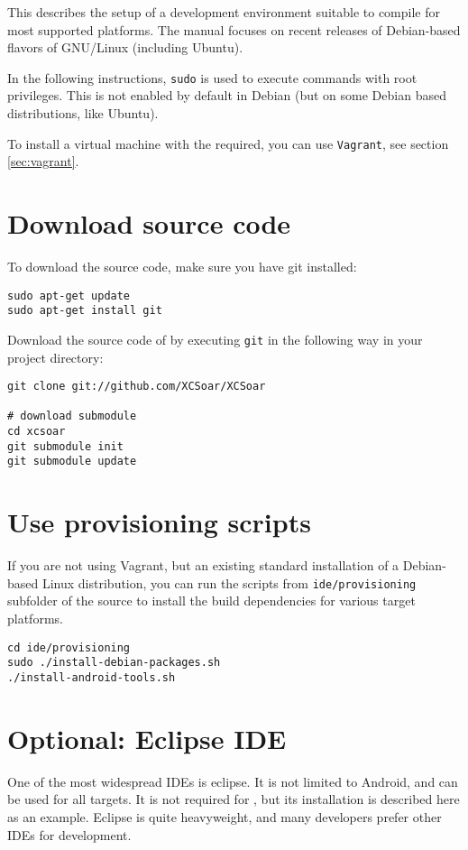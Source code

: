 This describes the setup of a development environment suitable to compile \xc
for most supported platforms. The manual focuses on recent releases of
Debian-based flavors of GNU/Linux (including Ubuntu).

In the following instructions, \texttt{sudo} is used to execute commands with
root privileges. This is not enabled by default in Debian (but on some Debian
based distributions, like Ubuntu).

To install a virtual machine with the required, you can use \texttt{Vagrant},
see section \ref{sec:vagrant}.

\section{Download source code}
To download the \xc source code, make sure you have git installed:
\begin{verbatim}
sudo apt-get update
sudo apt-get install git
\end{verbatim}

Download the source code of \xc by executing \texttt{git} in the following way in
your project directory:
\begin{verbatim}
git clone git://github.com/XCSoar/XCSoar

# download submodule
cd xcsoar
git submodule init
git submodule update
\end{verbatim}

\section{Use provisioning scripts}
If you are not using Vagrant, but an existing standard installation of a
Debian-based Linux distribution, you can run the scripts from
\texttt{ide/provisioning} subfolder of the \xc source to install the build
dependencies for various \xc target platforms.

\begin{verbatim}
cd ide/provisioning
sudo ./install-debian-packages.sh
./install-android-tools.sh
\end{verbatim}

\section{Optional: Eclipse IDE}
One of the most widespread IDEs is eclipse. It is not limited to Android, and can be used for all targets. It is not required for \xc, but its installation is described here as an example. Eclipse is quite heavyweight, and many developers prefer other IDEs for \xc development.

